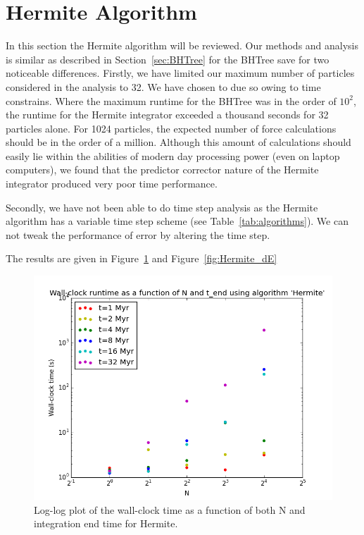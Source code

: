 \documentclass{aa}
\begin{document}

\section{Hermite Algorithm} \label{sec:Hermite}
In this section the Hermite algorithm will be reviewed. Our methods and analysis is similar as described in Section~\ref{sec:BHTree} for the BHTree save for two noticeable differences. Firstly, we have limited our maximum number of particles considered in the analysis to 32. We have chosen to due so owing to time constrains. Where the maximum runtime for the BHTree was in the order of $10^2$, the runtime for the Hermite integrator exceeded a thousand seconds for 32 particles alone. For 1024 particles, the expected number of force calculations should be in the order of a million. Although this amount of calculations should easily lie within the abilities of modern day processing power (even on laptop computers), we found that the predictor corrector nature of the Hermite integrator produced very poor time performance. 

Secondly, we have not been able to do time step analysis as the Hermite algorithm has a variable time step scheme (see Table~\ref{tab:algorithms}). We can not tweak the performance of error by altering the time step.

The results are given in Figure~\ref{fig:Hermite_runtime} and Figure~\ref{fig:Hermite_dE}


   \begin{figure}
   \centering
   \includegraphics[width=\hsize]{img/CA_GD_TLRH_s1603221_SS_s1617451_Hermite_runtime_log.png}
      \caption{Log-log plot of the wall-clock time as a function of both N and integration 
               end time for Hermite.
              }
         \label{fig:Hermite_runtime}
   \end{figure}
   
\end{document}
